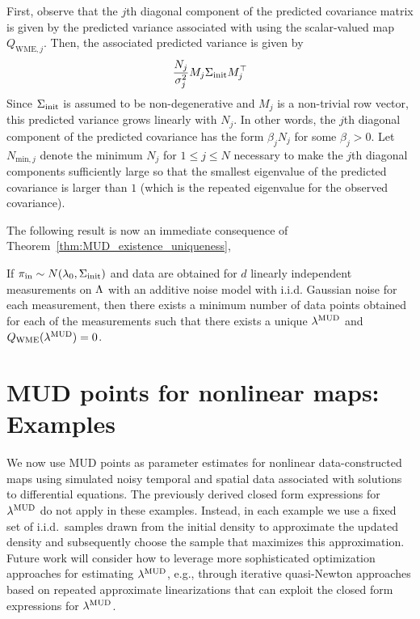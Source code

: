 First, observe that the $j$th diagonal component of the predicted covariance matrix is  given by the predicted variance associated with using the scalar-valued map $Q_{\text{WME},j}$.
Then, the associated predicted variance is given by
\begin{equation}
	\frac{N_j}{\sigma_j^2} M_j\Sigma_\text{init} M_j^\top
\end{equation}
Since $\Sigma_\text{init}$ is assumed to be non-degenerative and $M_j$ is a non-trivial row vector, this predicted variance grows linearly with $N_j$.
In other words, the $j$th diagonal component of the predicted covariance has the form $\beta_j N_j$ for some $\beta_j>0$.
Let $N_{\text{min},j}$ denote the minimum $N_j$ for $1\leq j\leq N$ necessary to make the $j$th diagonal components sufficiently large so that the smallest eigenvalue of the predicted covariance is larger than $1$ (which is the repeated eigenvalue for the observed covariance).

The following result is now an immediate consequence of Theorem~\ref{thm:MUD_existence_uniqueness},

\begin{corollary}\label{cor:MUD_wme}
If $\operatorname*{\pi_{in}} \sim N(\lambda_0,\Sigma_\text{init})$ and data are obtained for $d$ linearly independent measurements on ${\Lambda}$ with an additive noise model with i.i.d. Gaussian noise for each measurement, then there exists a minimum number of data points obtained for each of the measurements such that there exists a unique $\lambda^{\text{MUD}}$ and $Q_\text{WME}(\lambda^{\text{MUD}}) = 0$.
\end{corollary}



\section{MUD points for nonlinear maps: Examples}\label{sec:Parameter-identification}

We now use MUD points as parameter estimates for nonlinear data-constructed maps using simulated noisy temporal and spatial data associated with solutions to differential equations.
The previously derived closed form expressions for $\lambda^{\text{MUD}}$ do not apply in these examples.
Instead, in each example we use a fixed set of i.i.d.~samples drawn from the initial density to approximate the updated density and subsequently choose the sample that maximizes this approximation.
Future work will consider how to leverage more sophisticated optimization approaches for estimating $\lambda^{\text{MUD}}$, e.g., through iterative quasi-Newton approaches based on repeated approximate linearizations that can exploit the closed form expressions for $\lambda^{\text{MUD}}$.

